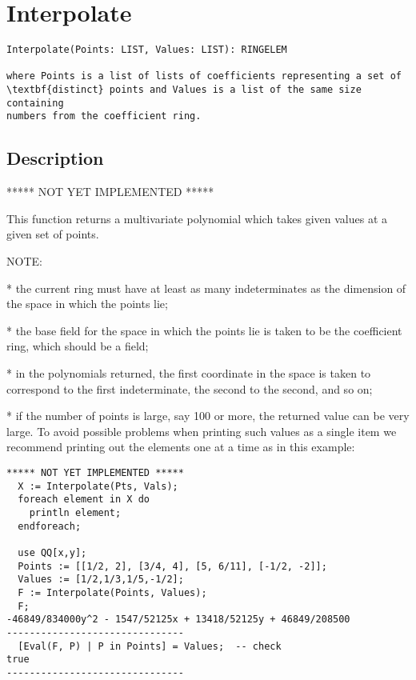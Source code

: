 \documentclass[a4paper]{mybook}
\newenvironment{command}{}{} %
\begin{document}
\section{Interpolate}
\label{Interpolate}
\begin{command} %


\begin{Verbatim}[label=syntax, rulecolor=\color{MidnightBlue},
frame=single]
Interpolate(Points: LIST, Values: LIST): RINGELEM

where Points is a list of lists of coefficients representing a set of
\textbf{distinct} points and Values is a list of the same size containing
numbers from the coefficient ring.
\end{Verbatim}


\subsection*{Description}

***** NOT YET IMPLEMENTED *****
\par 
This function returns a multivariate polynomial which takes given
values at a given set of points.
\par 
NOTE:
\par 
 * the current ring must have at least as many indeterminates as the
   dimension of the space in which the points lie;
\par 
 * the base field for the space in which the points lie is taken to be
   the coefficient ring, which should be a field;
\par 
 * in the polynomials returned, the first coordinate in the space is
   taken to correspond to the first indeterminate, the second to the
   second, and so on;
\par 
 * if the number of points is large, say 100 or more, the returned
   value can be very large.  To avoid possible problems when printing
   such values as a single item we recommend printing out the elements
   one at a time as in this example:
\begin{Verbatim}[label=example, rulecolor=\color{PineGreen}, frame=single]
***** NOT YET IMPLEMENTED *****
  X := Interpolate(Pts, Vals);
  foreach element in X do
    println element;
  endforeach;

  use QQ[x,y];
  Points := [[1/2, 2], [3/4, 4], [5, 6/11], [-1/2, -2]];
  Values := [1/2,1/3,1/5,-1/2];
  F := Interpolate(Points, Values);
  F;
-46849/834000y^2 - 1547/52125x + 13418/52125y + 46849/208500
-------------------------------
  [Eval(F, P) | P in Points] = Values;  -- check
true
-------------------------------
\end{Verbatim}


\end{command} %
\end{document}
